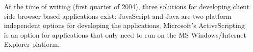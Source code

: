 At the time of writing (first quarter of 2004), three solutions for developing client side browser based applications exist: JavaScript and Java are two platform independent options for developing the applications, Microsoft's ActiveScripting is an option for applications that only need to run on the MS Windows/Internet Explorer platform.